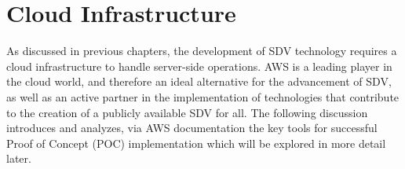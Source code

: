  \lstset{numbers=left}
 
\chapter{Cloud Infrastructure} \label{ch:AWSUsedServices}
As discussed in previous chapters, the development of SDV technology requires a cloud infrastructure to handle server-side operations. AWS is a leading player in the cloud world, and therefore an ideal alternative for the advancement of SDV, as well as an active partner in the implementation of technologies that contribute to the creation of a publicly available SDV for all. The following discussion introduces and analyzes, via AWS documentation the key tools for successful Proof of Concept (POC) implementation which will be explored in more detail later.

